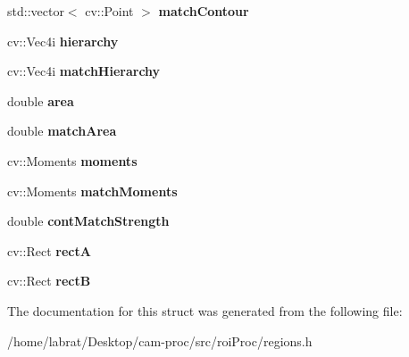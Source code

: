 \begin{DoxyCompactItemize}
\item 
std\+::vector$<$ cv\+::\+Point $>$ {\bfseries match\+Contour}\hypertarget{structROI_aba7814b0e89fb89505c432b5f7414f2f}{}\label{structROI_aba7814b0e89fb89505c432b5f7414f2f}

\item 
cv\+::\+Vec4i {\bfseries hierarchy}\hypertarget{structROI_a097a350ed44327cb7ac87e3b1a22d310}{}\label{structROI_a097a350ed44327cb7ac87e3b1a22d310}

\item 
cv\+::\+Vec4i {\bfseries match\+Hierarchy}\hypertarget{structROI_ad49ee8ecb259cff6e49375626b46b88f}{}\label{structROI_ad49ee8ecb259cff6e49375626b46b88f}

\item 
double {\bfseries area}\hypertarget{structROI_adffc2922d698900a1efc0fcffd78d326}{}\label{structROI_adffc2922d698900a1efc0fcffd78d326}

\item 
double {\bfseries match\+Area}\hypertarget{structROI_ac7a96ed12354b24d1021fa50180a7203}{}\label{structROI_ac7a96ed12354b24d1021fa50180a7203}

\item 
cv\+::\+Moments {\bfseries moments}\hypertarget{structROI_a70209b5deba7aa4d9241696d94ea66e1}{}\label{structROI_a70209b5deba7aa4d9241696d94ea66e1}

\item 
cv\+::\+Moments {\bfseries match\+Moments}\hypertarget{structROI_a9bdb5f1f37eb925e69937e9cc3809226}{}\label{structROI_a9bdb5f1f37eb925e69937e9cc3809226}

\item 
double {\bfseries cont\+Match\+Strength}\hypertarget{structROI_a585db9c64a6c5462cf62f6a46b8213a9}{}\label{structROI_a585db9c64a6c5462cf62f6a46b8213a9}

\item 
cv\+::\+Rect {\bfseries rectA}\hypertarget{structROI_ad4653d8374b5440f14d4e14286fc9dbc}{}\label{structROI_ad4653d8374b5440f14d4e14286fc9dbc}

\item 
cv\+::\+Rect {\bfseries rectB}\hypertarget{structROI_ada93f3fb24caf51a59277d8800b1d0ba}{}\label{structROI_ada93f3fb24caf51a59277d8800b1d0ba}

\end{DoxyCompactItemize}


The documentation for this struct was generated from the following file\+:\begin{DoxyCompactItemize}
\item 
/home/labrat/\+Desktop/cam-\/proc/src/roi\+Proc/regions.\+h\end{DoxyCompactItemize}
